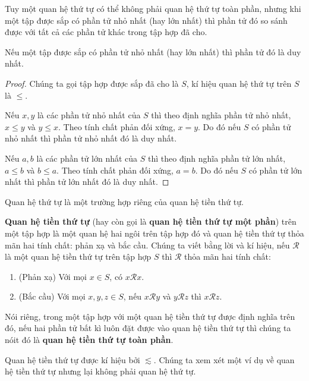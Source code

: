 Tuy một quan hệ thứ tự có thể không phải quan hệ thứ tự toàn phần, nhưng khi một tập được sắp có phần tử nhỏ nhất (hay lớn nhất) thì phần tử đó so sánh được với tất cả các phần tử khác trong tập hợp đã cho.

\begin{theorem}
    Nếu một tập được sắp có phần tử nhỏ nhất (hay lớn nhất) thì phần tử đó là duy nhất.
\end{theorem}

\begin{proof}
    Chúng ta gọi tập hợp được sắp đã cho là $S$, kí hiệu quan hệ thứ tự trên $S$ là $\leq$.

    Nếu $x, y$ là các phần tử nhỏ nhất của $S$ thì theo định nghĩa phần tử nhỏ nhất, $x\leq y$ và $y\leq x$. Theo tính chất phản đối xứng, $x = y$. Do đó nếu $S$ có phần tử nhỏ nhất thì phần tử nhỏ nhất đó là duy nhất.

    Nếu $a, b$ là các phần tử lớn nhất của $S$ thì theo định nghĩa phần tử lớn nhất, $a\leq b$ và $b\leq a$. Theo tính chất phản đối xứng, $a = b$. Do đó nếu $S$ có phần tử lớn nhất thì phần tử lớn nhất đó là duy nhất.
\end{proof}

Quan hệ thứ tự là một trường hợp riêng của quan hệ tiền thứ tự.

\begin{definition}
    \textbf{Quan hệ tiền thứ tự} (hay còn gọi là \textbf{quan hệ tiền thứ tự một phần}) trên một tập hợp là một quan hệ hai ngôi trên tập hợp đó và quan hệ tiền thứ tự thỏa mãn hai tính chất: phản xạ và bắc cầu. Chúng ta viết bằng lời và kí hiệu, nếu $\mathscr{R}$ là một quan hệ tiền thứ tự trên tập hợp $S$ thì $\mathscr{R}$ thỏa mãn hai tính chất:
    \begin{enumerate}[label={(\roman*)}]
        \item (Phản xạ) Với mọi $x\in S$, có $x\mathscr{R}x$.
        \item (Bắc cầu) Với mọi $x, y, z\in S$, nếu $x\mathscr{R}y$ và $y\mathscr{R}z$ thì $x\mathscr{R}z$.
    \end{enumerate}

    \noindent Nói riêng, trong một tập hợp với một quan hệ tiền thứ tự được định nghĩa trên đó, nếu hai phần tử bất kì luôn đặt được vào quan hệ tiền thứ tự thì chúng ta nóit đó là \textbf{quan hệ tiền thứ tự toàn phần}.
\end{definition}

Quan hệ tiền thứ tự được kí hiệu bởi $\lesssim$. Chúng ta xem xét một ví dụ về quan hệ tiền thứ tự nhưng lại không phải quan hệ thứ tự.

